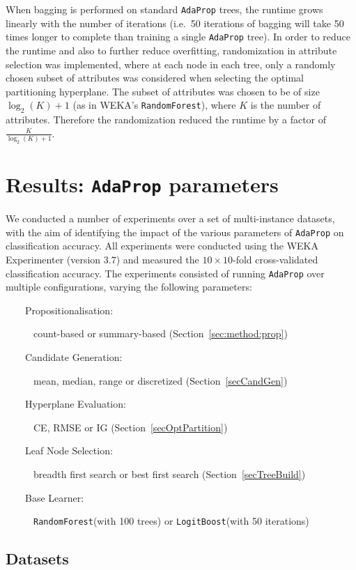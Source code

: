 \documentclass[a4paper,12pt]{report} %
\newcommand{\AdaProp}{\texttt{AdaProp}\xspace}
\newcommand{\blRF}{\texttt{RandomForest}\xspace}
\newcommand{\blLB}{\texttt{LogitBoost}\xspace}
\begin{document}
When bagging is performed on standard \AdaProp trees, 
    the runtime grows linearly with the number of iterations
    (i.e.\ 50 iterations of bagging will take 50 times longer
    to complete than training a single \AdaProp tree).
In order to reduce the runtime and also to further reduce overfitting, 
    randomization in attribute selection was implemented, 
    where at each node in each tree, only a randomly chosen subset of attributes 
    was considered when selecting the optimal partitioning hyperplane.
The subset of attributes was chosen to be of size $\log_2(K)+1$ (as in WEKA's \blRF),  
    where $K$ is the number of attributes.
Therefore the randomization reduced the runtime by a factor 
    of $\frac{K}{\log_2(K)+1}$.

\chapter{Results: \AdaProp parameters}
\label{chap:res:adaprop}

We conducted a number of experiments over a set of multi-instance datasets,
	with the aim of identifying the impact of the various parameters of \AdaProp on classification accuracy.
All experiments were conducted using the WEKA Experimenter (version 3.7) and
	measured the $10\times 10$-fold cross-validated classification accuracy.
The experiments consisted of running \AdaProp over multiple configurations, 
	varying the following parameters:
\begin{description}
	\item[~~~~Propositionalisation:] count-based or summary-based (Section~\ref{sec:method:prop})
	\item[~~~~Candidate Generation:] mean, median, range or discretized (Section~\ref{secCandGen})
	\item[~~~~Hyperplane Evaluation:] CE, RMSE or IG (Section~\ref{secOptPartition})
	\item[~~~~Leaf Node Selection:] breadth first search or best first search (Section~\ref{secTreeBuild})
	\item[~~~~Base Learner:] \blRF (with 100 trees) or \blLB (with 50 iterations)
\end{description}

\section{Datasets}
\end{document}
